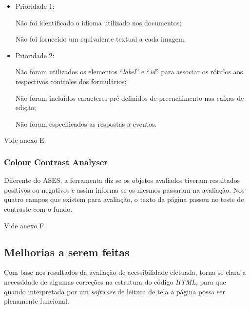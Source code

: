     \begin{itemize}
    \item Prioridade 1:
    
    Não foi identificado o idioma utilizado nos documentos;

    Não foi fornecido um equivalente textual a cada imagem.
    \item Prioridade 2:   
    
    Não foram utilizados os elementos “\textit{label}” e “\textit{id}” para associar os rótulos aos 
    respectivos controles dos formulários;

    Não foram incluídos caracteres pré-definidos de preenchimento nas caixas de edição;

    Não foram especificados as respostas a eventos.
    \end{itemize}
    
    Vide anexo E.
    
    \subsubsection{Colour Contrast Analyser}
    
    Diferente do ASES, a ferramenta diz se os objetos avaliados
    tiveram resultados positivos ou negativos e assim informa se os mesmos passaram na 
    avaliação. Nos quatro campos que existem para avaliação, o texto da página passou no teste 
    de contraste com o fundo.
    
    Vide anexo F.
    
    \subsection{Melhorias a serem feitas}
    
    Com base nos resultados da avaliação de acessibilidade efetuada, torna-se clara a
    necessidade de algumas correções na estrutura do código \textit{HTML},  para que quando 
    interpretada por um \textit{software} de leitura de tela a página possa ser plenamente funcional.